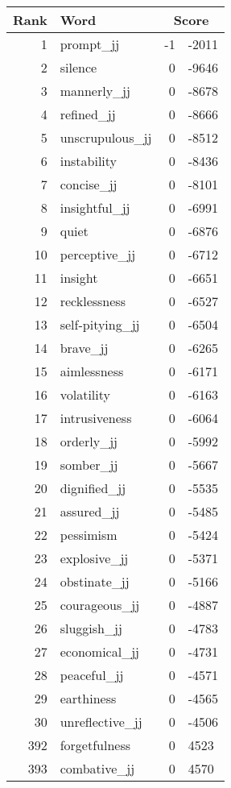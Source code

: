 \begin{longtable}[!htbp]{| rlr@{.}l |}
    \hline
    \textbf{Rank} & \textbf{Word} & \multicolumn{2}{c|}{\textbf{Score}} \\
    \hline
    \endhead
    1 & prompt\_jj & -1 & -2011 \\
    2 & silence & 0 & -9646 \\
    3 & mannerly\_jj & 0 & -8678 \\
    4 & refined\_jj & 0 & -8666 \\
    5 & unscrupulous\_jj & 0 & -8512 \\
    6 & instability & 0 & -8436 \\
    7 & concise\_jj & 0 & -8101 \\
    8 & insightful\_jj & 0 & -6991 \\
    9 & quiet & 0 & -6876 \\
    10 & perceptive\_jj & 0 & -6712 \\
    11 & insight & 0 & -6651 \\
    12 & recklessness & 0 & -6527 \\
    13 & self-pitying\_jj & 0 & -6504 \\
    14 & brave\_jj & 0 & -6265 \\
    15 & aimlessness & 0 & -6171 \\
    16 & volatility & 0 & -6163 \\
    17 & intrusiveness & 0 & -6064 \\
    18 & orderly\_jj & 0 & -5992 \\
    19 & somber\_jj & 0 & -5667 \\
    20 & dignified\_jj & 0 & -5535 \\
    21 & assured\_jj & 0 & -5485 \\
    22 & pessimism & 0 & -5424 \\
    23 & explosive\_jj & 0 & -5371 \\
    24 & obstinate\_jj & 0 & -5166 \\
    25 & courageous\_jj & 0 & -4887 \\
    26 & sluggish\_jj & 0 & -4783 \\
    27 & economical\_jj & 0 & -4731 \\
    28 & peaceful\_jj & 0 & -4571 \\
    29 & earthiness & 0 & -4565 \\
    30 & unreflective\_jj & 0 & -4506 \\
    392 & forgetfulness & 0 & 4523 \\
    393 & combative\_jj & 0 & 4570 \\

\end{longtable}
